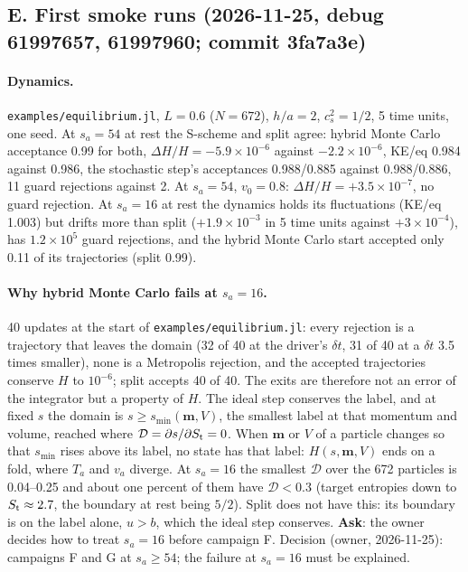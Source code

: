 \documentclass[11pt,aps,preprint,nofootinbib,superscriptaddress,tightenlines]{revtex4-2}
\let\oldparagraph\paragraph
\renewcommand{\paragraph}{\par\bigskip\oldparagraph}
\begin{document}
\subsection*{E. First smoke runs (2026-11-25, debug 61997657, 61997960; commit 3fa7a3e)}

\paragraph{Dynamics.}  \nolinkurl{examples/equilibrium.jl}, $L=0.6$ ($N=672$), $h/a=2$, $c_s^2=1/2$, 5 time units, one seed.  At $s_a=54$ at rest the
S-scheme and split agree: hybrid Monte Carlo acceptance 0.99 for both, $\Delta H/H=-5.9\times10^{-6}$ against $-2.2\times10^{-6}$, KE/eq 0.984 against
0.986, the stochastic step's acceptances 0.988/0.885 against 0.988/0.886, 11 guard rejections against 2.  At $s_a=54$, $v_0=0.8$: $\Delta H/H=+3.5\times10^{-7}$,
no guard rejection.  At $s_a=16$ at rest the dynamics holds its fluctuations (KE/eq 1.003) but drifts more than split ($+1.9\times10^{-3}$ in 5 time units
against $+3\times10^{-4}$), has $1.2\times10^5$ guard rejections, and the hybrid Monte Carlo start accepted only 0.11 of its trajectories (split 0.99).

\paragraph{Why hybrid Monte Carlo fails at $s_a=16$.}  40 updates at the start of \nolinkurl{examples/equilibrium.jl}: every rejection is a trajectory
that leaves the domain (32 of 40 at the driver's $\delta t$, 31 of 40 at a $\delta t$ 3.5 times smaller), none is a Metropolis rejection, and the
accepted trajectories conserve $H$ to $10^{-6}$; split accepts 40 of 40.  The exits are therefore not an error of the integrator but a property of
$H$.  The ideal step conserves the label, and at fixed $s$ the domain is $s\ge s_{\min}(\bm m,V)$, the smallest label at that momentum and volume,
reached where $\mathcal D=\partial s/\partial S_{\rm t}=0$.  When $\bm m$ or $V$ of a particle changes so that $s_{\min}$ rises above its label, no state
has that label: $H(s,\bm m,V)$ ends on a fold, where $T_a$ and $v_a$ diverge.  At $s_a=16$ the smallest $\mathcal D$ over the 672 particles is
0.04--0.25 and about one percent of them have $\mathcal D<0.3$ (target entropies down to $S_{\rm t}\approx2.7$, the boundary at rest being $5/2$).
Split does not have this: its boundary is on the label alone, $u>b$, which the ideal step conserves.
\textbf{Ask}: the owner decides how to treat $s_a=16$ before campaign F.  Decision (owner, 2026-11-25): campaigns F and G at $s_a\ge54$; the failure
at $s_a=16$ must be explained.
\end{document}
